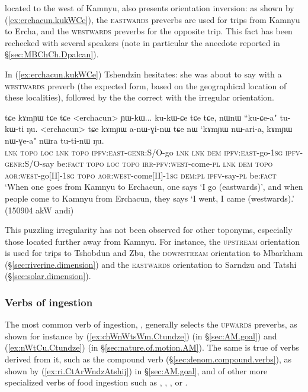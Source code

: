 located to the west of Kamnyu, also presents orientation inversion: as shown by (\ref{ex:erchacun.kukWCe}), the \textsc{eastwards} preverbs are used for trips from Kamnyu to Ercha, and the \textsc{westwards} preverbs for the opposite trip. This fact has been rechecked with several speakers (note in particular the anecdote reported in §\ref{sec:MBChCh.Dpalcan}).

In (\ref{ex:erchacun.kukWCe}) Tshendzin hesitates: she was about to say  with a \textsc{westwards} preverb (the expected form, based on the geographical location of these localities), followed by the the correct  with the irregular orientation.

\begin{exe}
\ex \label{ex:erchacun.kukWCe}
\gll tɕe kɤmɲɯ tɕe tɕe <erchacun> ɲɯ-kɯ... ku-kɯ-ɕe tɕe tɕe, nɯnɯ ``ku-ɕe-a" tu-kɯ-ti ŋu. <erchacun> tɕe kɤmɲɯ a-nɯ-ɣi-nɯ tɕe nɯ `kɤmɲɯ nɯ-ari-a, kɤmɲɯ nɯ-ɣe-a" nɯra tu-ti-nɯ ŋu. \\
\textsc{lnk}  \textsc{topo} \textsc{loc} \textsc{lnk}  \textsc{topo} { } \textsc{ipfv}:\textsc{east}-\textsc{genr}:S/O-go \textsc{lnk} \textsc{lnk} \textsc{dem} \textsc{ipfv}:\textsc{east}-go-\textsc{1sg} \textsc{ipfv}-\textsc{genr}:S/O-say be:\textsc{fact}  \textsc{topo} \textsc{loc}  \textsc{topo} \textsc{irr}-\textsc{pfv}:\textsc{west}-come-\textsc{pl} \textsc{lnk} \textsc{dem}  \textsc{topo} \textsc{aor}:\textsc{west}-go[II]-\textsc{1sg}  \textsc{topo} \textsc{aor}:\textsc{west}-come[II]-\textsc{1sg}  \textsc{dem}:\textsc{pl} \textsc{ipfv}-say-\textsc{pl} be:\textsc{fact} \\
\glt `When one goes from Kamnyu to Erchacun, one says `I go (eastwards)', and when people come to Kamnyu from Erchacun, they says `I went, I came (westwards).'
(150904 akW andi)
\end{exe}

This puzzling irregularity has not been observed for other toponyms, especially those located further away from Kamnyu. For instance, the \textsc{upstream} orientation is used for trips to Tshobdun and Zbu, the \textsc{downstream} orientation to Mbarkham (§\ref{sec:riverine.dimension}) and the \textsc{eastwards} orientation to Sarndzu and Tatshi (§\ref{sec:solar.dimension}).


\subsubsection{Verbs of ingestion} \label{sec:preverb.ingestion}
The most common verb of ingestion, , generally selects the \textsc{upwards} preverbs, as shown for instance by (\ref{ex:chWnWtsWm.Ctundze}) (in §\ref{sec:AM.goal}) and (\ref{ex:nWtCu.Ctundze}) (in §\ref{sec:nature.of.motion.AM}). The same is true of verbs derived from it, such as the compound verb  (§\ref{sec:denom.compound.verbs}), as shown by (\ref{ex:ri.CtArWndzAtshij}) in §\ref{sec:AM.goal}, and of other more specialized verbs of food ingestion such as , , ,  or .

